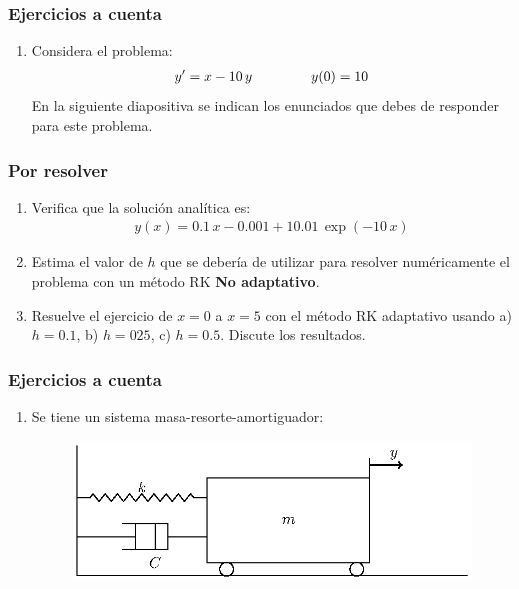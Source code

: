 \documentclass[12pt]{beamer}
\begin{document}
\begin{frame}
\frametitle{Ejercicios a cuenta}
\begin{enumerate}
\item Considera el problema:
\begin{align*}
{y}^{\prime} = x - 10 \, y \hspace{1.5cm} y (0) = 10
\end{align*}
En la siguiente diapositiva se indican los enunciados que debes de responder para este problema.
\seti
\end{enumerate}
\end{frame}
\begin{frame}
\frametitle{Por resolver}
\begin{enumerate}
\item Verifica que la solución analítica es:
\begin{align*}
y (x) = 0.1 \, x - 0.001 + 10.01 \, \exp(-10 \, x)
\end{align*}
\item Estima el valor de $h$ que se debería de utilizar para resolver numéricamente el problema con un método RK \textbf{No adaptativo}.
\item Resuelve el ejercicio de $x = 0$ a $x = 5$ con el método RK adaptativo usando a) $h = 0.1$, b) $h = 025$, c) $h = 0.5$. Discute los resultados.
\end{enumerate}
    
\end{frame}
\begin{frame}
\frametitle{Ejercicios a cuenta}
\begin{enumerate}
\item Se tiene un sistema masa-resorte-amortiguador:
\begin{figure}
    \centering
    \includegraphics[scale=0.95]{Imagenes/Ejercicio_Cuenta_RKAdaptativo_01.eps}
\end{figure}
\seti
\end{enumerate}
\end{frame}
\end{document}
